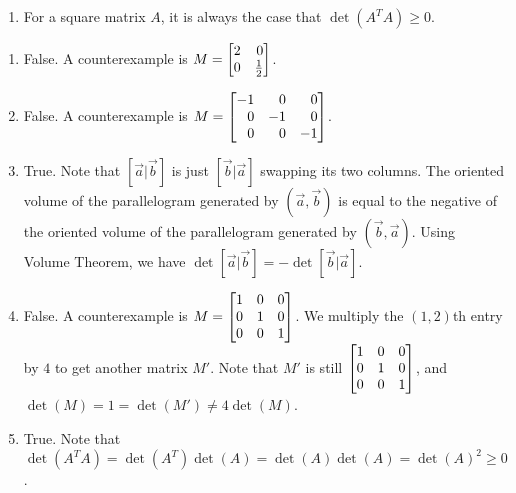 \begin{exercises}
\begin{problist}
\begin{enumerate}
			\item For a square matrix $A$, it is always the case that $\det(A^TA)\geq 0$.
		\end{enumerate}
        \begin{solution}
        \begin{enumerate}
            \item False. A counterexample is $M=\mat{2 & 0 \\ 0 & \frac{1}{2}}$.
            \item False. A counterexample is $M=\mat{-1 & 0 & 0 \\ 0 & -1 & 0 \\ 0 & 0 & -1}$.
            \item True. Note that $[\vec a|\vec b]$ is just $[\vec b|\vec a]$ swapping its two columns. The oriented volume of the parallelogram generated by $(\vec a,\vec b)$ is equal to the negative of the oriented volume of the parallelogram generated by $(\vec b,\vec a)$. Using Volume Theorem, we have $\det[\vec a|\vec b]=-\det[\vec b|\vec a]$.
            \item False. A counterexample is $M=\mat{1 & 0 & 0 \\ 0 & 1 & 0 \\ 0 & 0 & 1}$. We multiply the $(1,2)$th entry by $4$ to get another matrix $M'$. Note that $M'$ is still $\mat{1 & 0 & 0 \\ 0 & 1 & 0 \\ 0 & 0 & 1 }$, and $\det(M)=1=\det(M')\ne 4\det(M)$.
            \item True. Note that $\det(A^T A)=\det(A^T)\det(A)=\det(A)\det(A)=\det(A)^2\ge 0$.
        \end{enumerate}
        \end{solution}
	\end{problist}
\end{exercises}
